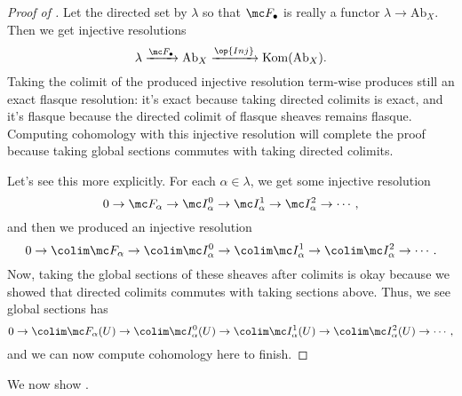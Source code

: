\documentclass[../notes.tex]{subfiles}
\begin{document}
\begin{proof}[Proof of ]
	Let the directed set by $\lambda$ so that $\mc F_\bullet$ is really a functor $\lambda\to\mathrm{Ab}_X$. Then we get injective resolutions
	\[\lambda\xrightarrow{\mc F_\bullet}\mathrm{Ab}_X\xrightarrow{\op{Inj}}\mathrm{Kom}(\mathrm{Ab}_X).\]
	Taking the colimit of the produced injective resolution term-wise produces still an exact flasque resolution: it's exact because taking directed colimits is exact, and it's flasque because the directed colimit of flasque sheaves remains flasque. Computing cohomology with this injective resolution will complete the proof because taking global sections commutes with taking directed colimits.

	Let's see this more explicitly. For each $\alpha\in\lambda$, we get some injective resolution
	\[0\to\mc F_\alpha\to\mc I^0_\alpha\to\mc I^1_\alpha\to\mc I^2_\alpha\to\cdots,\]
	and then we produced an injective resolution
	\[0\to\colim\mc F_\alpha\to\colim\mc I^0_\alpha\to\colim\mc I^1_\alpha\to\colim\mc I^2_\alpha\to\cdots.\]
	Now, taking the global sections of these sheaves after colimits is okay because we showed that directed colimits commutes with taking sections above. Thus, we see global sections has
	\[0\to\colim\mc F_\alpha(U)\to\colim\mc I^0_\alpha(U)\to\colim\mc I^1_\alpha(U)\to\colim\mc I^2_\alpha(U)\to\cdots,\]
	and we can now compute cohomology here to finish.
\end{proof}
We now show .
\dimboundcohom*
\end{document}
